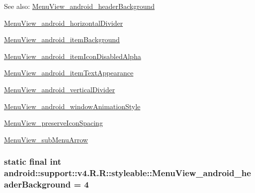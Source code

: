 \begin{Desc}
\item[See also:]\hyperlink{classandroid_1_1support_1_1v4_1_1_r_1_1styleable_64d916065b7bff29e75fd9d984101ef0}{MenuView\_\-android\_\-headerBackground} 

\hyperlink{classandroid_1_1support_1_1v4_1_1_r_1_1styleable_c6c0a8c4be773bbaff1bdb2cd894c2ab}{MenuView\_\-android\_\-horizontalDivider} 

\hyperlink{classandroid_1_1support_1_1v4_1_1_r_1_1styleable_9fd625d2301e72bc9b04d2fca592d709}{MenuView\_\-android\_\-itemBackground} 

\hyperlink{classandroid_1_1support_1_1v4_1_1_r_1_1styleable_020f8607a79d9f432c3dc7dda196136b}{MenuView\_\-android\_\-itemIconDisabledAlpha} 

\hyperlink{classandroid_1_1support_1_1v4_1_1_r_1_1styleable_f5aae86805e86421e406c3299856bfae}{MenuView\_\-android\_\-itemTextAppearance} 

\hyperlink{classandroid_1_1support_1_1v4_1_1_r_1_1styleable_463a5ddae67100490816566a6e87082b}{MenuView\_\-android\_\-verticalDivider} 

\hyperlink{classandroid_1_1support_1_1v4_1_1_r_1_1styleable_2235933d1e99168194dc75356546ce5f}{MenuView\_\-android\_\-windowAnimationStyle} 

\hyperlink{classandroid_1_1support_1_1v4_1_1_r_1_1styleable_1a86f6ebd0fdcf4d5eadc06edfcd42c6}{MenuView\_\-preserveIconSpacing} 

\hyperlink{classandroid_1_1support_1_1v4_1_1_r_1_1styleable_4e42622f8c86c7431121ce63d8486454}{MenuView\_\-subMenuArrow} \end{Desc}
\hypertarget{classandroid_1_1support_1_1v4_1_1_r_1_1styleable_64d916065b7bff29e75fd9d984101ef0}{
\subsubsection[{MenuView\_\-android\_\-headerBackground}]{\setlength{\rightskip}{0pt plus 5cm}static final int android::support::v4.R.R::styleable::MenuView\_\-android\_\-headerBackground = 4}}
\label{classandroid_1_1support_1_1v4_1_1_r_1_1styleable_64d916065b7bff29e75fd9d984101ef0}


